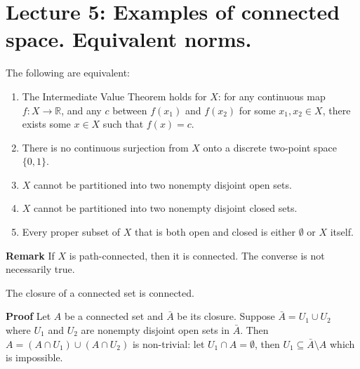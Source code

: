 \documentclass[main.tex]{subfiles}
\begin{document}
\pagestyle{plain}
\setcounter{chapter}{4}

\chapter{Lecture 5: Examples of connected space. Equivalent norms.}
\label{chap:chapter5}

\begin{theorem}
    The following are equivalent: 
    \begin{enumerate}
        \item The Intermediate Value Theorem holds for $X$: for any continuous map $f: X \rightarrow \mathbb{R}$, and any $c$ between $f(x_1)$ and $f(x_2)$ for some $x_1, x_2 \in X$, there exists some $x \in X$ such that $f(x) = c$.
        \item There is no continuous surjection from $X$ onto a discrete two-point space $\{0,1\}$.
        \item $X$ cannot be partitioned into two nonempty disjoint open sets.
        \item $X$ cannot be partitioned into two nonempty disjoint closed sets.
        \item Every proper subset of $X$ that is both open and closed is either $\emptyset$ or $X$ itself. 
    \end{enumerate}
\end{theorem}

\par \noindent \textbf{Remark} If $X$ is path-connected, then it is connected. The converse is not necessarily true.
\begin{lemma}
    The closure of a connected set is connected.
\end{lemma}
\par \noindent \textbf{Proof} Let $A$ be a connected set and $\bar{A}$ be its closure. Suppose $\bar{A} = U_1 \cup U_2$ where $U_1$ and $U_2$ are nonempty disjoint open sets in $\bar{A}$. Then $A = (A \cap U_1) \cup (A \cap U_2)$ is non-trivial: let $U_1\cap A = \emptyset$, then $U_1 \subseteq \bar{A} \setminus A$ which is impossible. 
\end{document}
